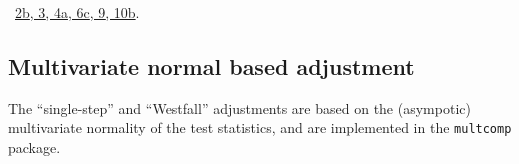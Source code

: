\documentclass[reqno]{amsart}
\renewcommand{\NWlink}[2]{\hyperlink{#1}{#2}}
\begin{document}
\begin{flushleft}
\begin{list}{}{}
\mbox{}\verb@  }@\\
\mbox{}\verb@  @\\
\mbox{}\verb@  out <- adjusted[base]@\\
\mbox{}\verb@  names(out) <- hypotheses@\\
\mbox{}\verb@  return(out)@\\
\mbox{}\verb@}@\\
\mbox{}\verb@@{\NWsep}
\end{list}
\vspace{-1.5ex}
\footnotesize
\begin{list}{}{\setlength{\itemsep}{-\parsep}\setlength{\itemindent}{-\leftmargin}}
\item \NWtxtFileDefBy\ \NWlink{nuweb2b}{2b}\NWlink{nuweb3}{, 3}\NWlink{nuweb4a}{, 4a}\NWlink{nuweb6c}{, 6c}\NWlink{nuweb9}{, 9}\NWlink{nuweb10b}{, 10b}.

\item{}
\end{list}
\vspace{4ex}
\end{flushleft}
\subsection{Multivariate normal based adjustment}
The ``single-step'' and ``Westfall'' adjustments are based on the (asympotic) multivariate normality of the test statistics, and
are implemented in the \texttt{multcomp} package.
\end{document}
